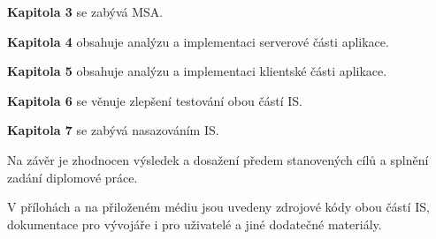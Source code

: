 \textbf{Kapitola 3} se zabývá \gls{MSA}.

\textbf{Kapitola 4} obsahuje analýzu a implementaci serverové části aplikace.

\textbf{Kapitola 5} obsahuje analýzu a implementaci klientské části aplikace.

\textbf{Kapitola 6} se věnuje zlepšení testování obou částí \gls{IS}.

\textbf{Kapitola 7} se zabývá nasazováním \gls{IS}.

Na závěr je zhodnocen výsledek a dosažení předem stanovených cílů a splnění zadání diplomové práce.

V přílohách a na přiloženém médiu jsou uvedeny zdrojové kódy obou částí \gls{IS}, dokumentace pro vývojáře i pro uživatelé a jiné dodatečné materiály.

